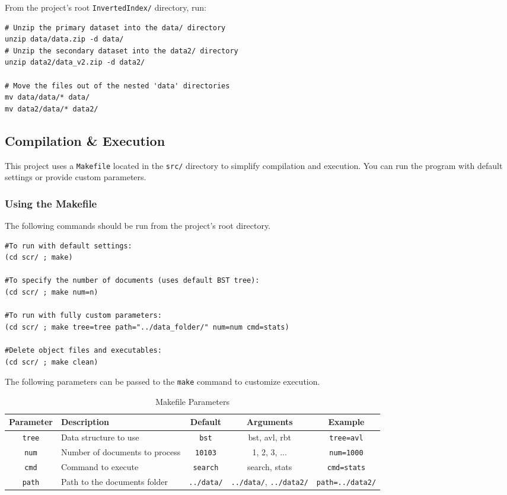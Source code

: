 From the project's root \texttt{InvertedIndex/} directory, run:
\begin{verbatim}
# Unzip the primary dataset into the data/ directory
unzip data/data.zip -d data/
# Unzip the secondary dataset into the data2/ directory
unzip data2/data_v2.zip -d data2/

# Move the files out of the nested 'data' directories
mv data/data/* data/
mv data2/data/* data2/
\end{verbatim}


\subsection{Compilation \& Execution}

This project uses a \texttt{Makefile} located in the \texttt{src/} directory to simplify compilation and execution. You can run the program with default settings or provide custom parameters.

\subsubsection{Using the Makefile}

The following commands should be run from the project's root directory.
    
    \begin{verbatim}
#To run with default settings:
(cd scr/ ; make)

#To specify the number of documents (uses default BST tree):
(cd scr/ ; make num=n)
    
#To run with fully custom parameters:
(cd scr/ ; make tree=tree path="../data_folder/" num=num cmd=stats)

#Delete object files and executables: 
(cd scr/ ; make clean)
    \end{verbatim}



The following parameters can be passed to the \texttt{make} command to customize execution.

\begin{table}[H]
\centering
\renewcommand{\arraystretch}{1.3}
\begin{tabular}{|c|>{\centering\arraybackslash}p{6cm}|c|c|c|} 
\hline
\textbf{Parameter} & \textbf{Description} & \textbf{Default} & \textbf{Arguments} & \textbf{Example} \\
\hline
\texttt{tree} & Data structure to use & \texttt{bst} & bst, avl, rbt & \texttt{tree=avl} \\
\texttt{num} & Number of documents to process & \texttt{10103} & 1, 2, 3, ... & \texttt{num=1000} \\
\texttt{cmd} & Command to execute & \texttt{search} & search, stats & \texttt{cmd=stats} \\
\texttt{path} & Path to the documents folder & \texttt{../data/} & \texttt{../data/}, \texttt{../data2/} & \texttt{path=../data2/} \\
\hline
\end{tabular}
\caption{Makefile Parameters}
\label{tab:config_params}
\end{table}


